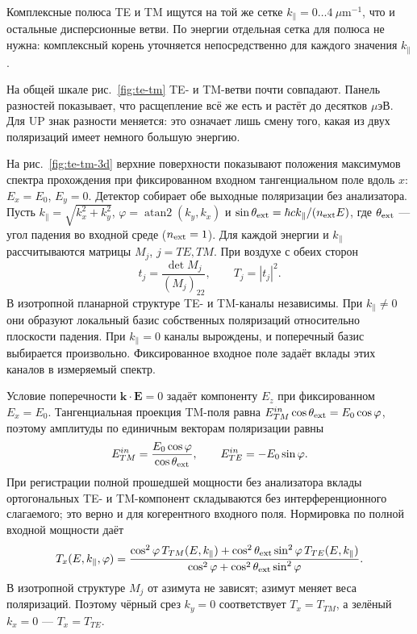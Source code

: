 \documentclass[12pt,a4paper]{article}
\begin{document}
Комплексные полюса TE и TM ищутся на той же сетке $k_\parallel=0\ldots4\ \mu\mathrm m^{-1}$, что и остальные дисперсионные ветви. По энергии отдельная сетка для полюса не нужна: комплексный корень уточняется непосредственно для каждого значения $k_\parallel$.

На общей шкале рис.~\ref{fig:te-tm} TE- и TM-ветви почти совпадают. Панель разностей показывает, что расщепление всё же есть и растёт до десятков $\mu$эВ. Для UP знак разности меняется: это означает лишь смену того, какая из двух поляризаций имеет немного большую энергию.


На рис.~\ref{fig:te-tm-3d} верхние поверхности показывают положения
максимумов спектра прохождения при фиксированном входном тангенциальном
поле вдоль $x$: $E_x=E_0$, $E_y=0$. Детектор собирает обе выходные поляризации без анализатора.
Пусть $k_\parallel=\sqrt{k_x^2+k_y^2}$,
$\varphi=\operatorname{atan2}(k_y,k_x)$ и
$\sin\theta_{\rm ext}=\hbar c k_\parallel/(n_{\rm ext}E)$, где $\theta_{\rm ext}$ --- угол
падения во входной среде ($n_{\rm ext}=1$). Для каждой энергии и
$k_\parallel$ рассчитываются матрицы $M_j$, $j=TE,TM$.
При воздухе с обеих сторон
\[
t_j=\frac{\det M_j}{(M_j)_{22}},\qquad T_j=|t_j|^2.
\]
В изотропной планарной структуре TE- и TM-каналы независимы.
При $k_\parallel\ne0$ они образуют локальный базис собственных поляризаций
относительно плоскости падения. При $k_\parallel=0$ каналы вырождены,
и поперечный базис выбирается произвольно. Фиксированное входное поле
задаёт вклады этих каналов в измеряемый спектр.

Условие поперечности $\mathbf{k}\cdot\mathbf{E}=0$ задаёт компоненту
$E_z$ при фиксированном $E_x=E_0$. Тангенциальная проекция TM-поля
равна $E_{TM}^{in}\cos\theta_{\rm ext}=E_0\cos\varphi$, поэтому
амплитуды по единичным векторам поляризации равны
\[
E_{TM}^{in}=\frac{E_0\cos\varphi}{\cos\theta_{\rm ext}},\qquad
E_{TE}^{in}=-E_0\sin\varphi.
\]
При регистрации полной прошедшей мощности без анализатора вклады
ортогональных TE- и TM-компонент складываются без интерференционного
слагаемого; это верно и для когерентного входного поля.
Нормировка по полной входной мощности даёт
\[
T_x(E,k_\parallel,\varphi)=
\frac{\cos^2\varphi\,T_{TM}(E,k_\parallel)
+\cos^2\theta_{\rm ext}\sin^2\varphi\,T_{TE}(E,k_\parallel)}
{\cos^2\varphi+\cos^2\theta_{\rm ext}\sin^2\varphi}.
\]
В изотропной структуре $M_j$ от азимута не зависят; азимут меняет
веса поляризаций. Поэтому чёрный срез $k_y=0$ соответствует
$T_x=T_{TM}$, а зелёный $k_x=0$ --- $T_x=T_{TE}$.
\end{document}
